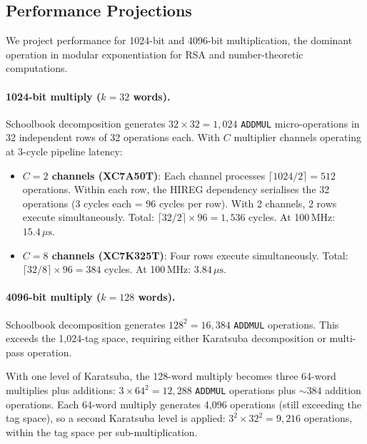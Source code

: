 \documentclass[11pt,a4paper]{article}
\begin{document}
\subsection{Performance Projections}
\label{sec:performance}

We project performance for 1024-bit and 4096-bit multiplication, the
dominant operation in modular exponentiation for RSA and number-theoretic
computations.

\paragraph{1024-bit multiply ($k = 32$ words).}

Schoolbook decomposition generates $32 \times 32 = 1{,}024$ \texttt{ADDMUL}
micro-operations in 32 independent rows of 32 operations each.  With
$C$ multiplier channels operating at 3-cycle pipeline latency:

\begin{itemize}[leftmargin=*]
  \item \textbf{$C = 2$ channels (XC7A50T)}: Each channel processes
    $\lceil 1024/2 \rceil = 512$ operations.  Within each row, the
    HIREG dependency serialises the 32 operations (3 cycles each = 96
    cycles per row).  With 2 channels, 2 rows execute simultaneously.
    Total: $\lceil 32/2 \rceil \times 96 = 1{,}536$ cycles.  At 100\,MHz:
    $15.4\,\mu\text{s}$.

  \item \textbf{$C = 8$ channels (XC7K325T)}: Four rows execute
    simultaneously.  Total: $\lceil 32/8 \rceil \times 96 = 384$ cycles.
    At 100\,MHz: $3.84\,\mu\text{s}$.
\end{itemize}

\paragraph{4096-bit multiply ($k = 128$ words).}

Schoolbook decomposition generates $128^2 = 16{,}384$ \texttt{ADDMUL}
operations.  This exceeds the 1,024-tag space, requiring either Karatsuba
decomposition or multi-pass operation.

With one level of Karatsuba, the 128-word multiply becomes three 64-word
multiplies plus additions: $3 \times 64^2 = 12{,}288$ \texttt{ADDMUL}
operations plus $\sim 384$ addition operations.  Each 64-word multiply
generates 4,096 operations (still exceeding the tag space), so a second
Karatsuba level is applied: $3^2 \times 32^2 = 9{,}216$ operations, within
the tag space per sub-multiplication.
\end{document}

